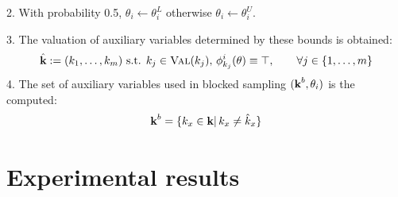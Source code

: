 2. With probability 0.5, $\theta_i \leftarrow \theta_i^L$ otherwise $\theta_i \leftarrow \theta_i^U$.

3. The valuation of auxiliary variables determined by these bounds is obtained:
\begin{align*}
\hat{\textbf{k}} := (k_1, \ldots, k_m) \text{ s.t. } k_j \in \textsc{Val}(k_j),\, \phi^i_{k_j}(\theta) \equiv \top, \qquad \forall j \in \{1, \ldots, m\} 
\end{align*}
4. The set of auxiliary variables used in blocked sampling $(\textbf{k}^b, \theta_i)$ is the computed:
\begin{align*}
\textbf{k}^b = \{k_x \in \textbf{k} | \, k_x \neq \hat{k}_x\}
\end{align*} 



\section{Experimental results}
\label{sect:experiment}

